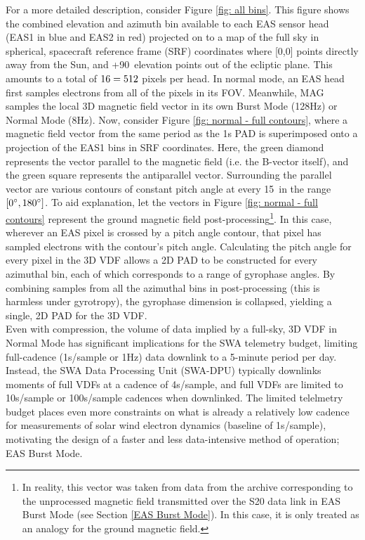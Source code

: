 For a more detailed description, consider Figure \ref{fig: all bins}. This figure shows the combined elevation and azimuth bin  available to each EAS sensor head (EAS1 in blue and EAS2 in red) projected on to a map of the full sky in spherical, spacecraft reference frame (SRF) coordinates where [0,0] points directly away from the Sun, and +90\degree\ elevation points out of the ecliptic plane. This amounts to a total of \(16\time32=512\) pixels per head. In normal mode, an EAS head first samples electrons from all of the pixels in its FOV. Meanwhile, MAG samples the local 3D magnetic field vector in its own Burst Mode (128Hz) or Normal Mode (8Hz)\cite{horbury2020}. Now, consider Figure \ref{fig: normal - full contours}, where a magnetic field vector from the same period as the 1s PAD is superimposed onto a projection of the EAS1 bins in SRF coordinates. Here, the green diamond represents the vector parallel to the magnetic field (i.e. the B-vector itself), and the green square represents the antiparallel vector. Surrounding the parallel vector are various contours of constant pitch angle at every 15\degree\ in the range \([0\degree,180\degree]\). To aid explanation, let the vectors in Figure \ref{fig: normal - full contours} represent the ground magnetic field post-processing\footnote{In reality, this vector was taken from data from the archive corresponding to the unprocessed magnetic field transmitted over the S20 data link in EAS Burst Mode (see Section \ref{EAS Burst Mode}). In this case, it is only treated as an analogy for the ground magnetic field.}. In this case, wherever an EAS pixel is crossed by a pitch angle contour, that pixel has sampled electrons with the contour's pitch angle. Calculating the pitch angle for every pixel in the 3D VDF allows a 2D PAD to be constructed for every azimuthal bin, each of which corresponds to a range of gyrophase angles. By combining samples from all the azimuthal bins in post-processing (this is harmless under gyrotropy), the gyrophase dimension is collapsed, yielding a single, 2D PAD for the 3D VDF.
\\

Even with compression, the volume of data implied by a full-sky, 3D VDF in Normal Mode has significant implications for the SWA telemetry budget, limiting full-cadence (1s/sample or 1Hz) data downlink to a 5-minute period per day. Instead, the SWA Data Processing Unit (SWA-DPU) typically downlinks moments of full VDFs at a cadence of 4s/sample, and full VDFs are limited to 10s/sample or 100s/sample cadences when downlinked. The limited telelmetry budget places even more constraints on what is already a relatively low cadence for measurements of solar wind electron dynamics (baseline of 1s/sample), motivating the design of a faster and less data-intensive method of operation; EAS Burst Mode.

